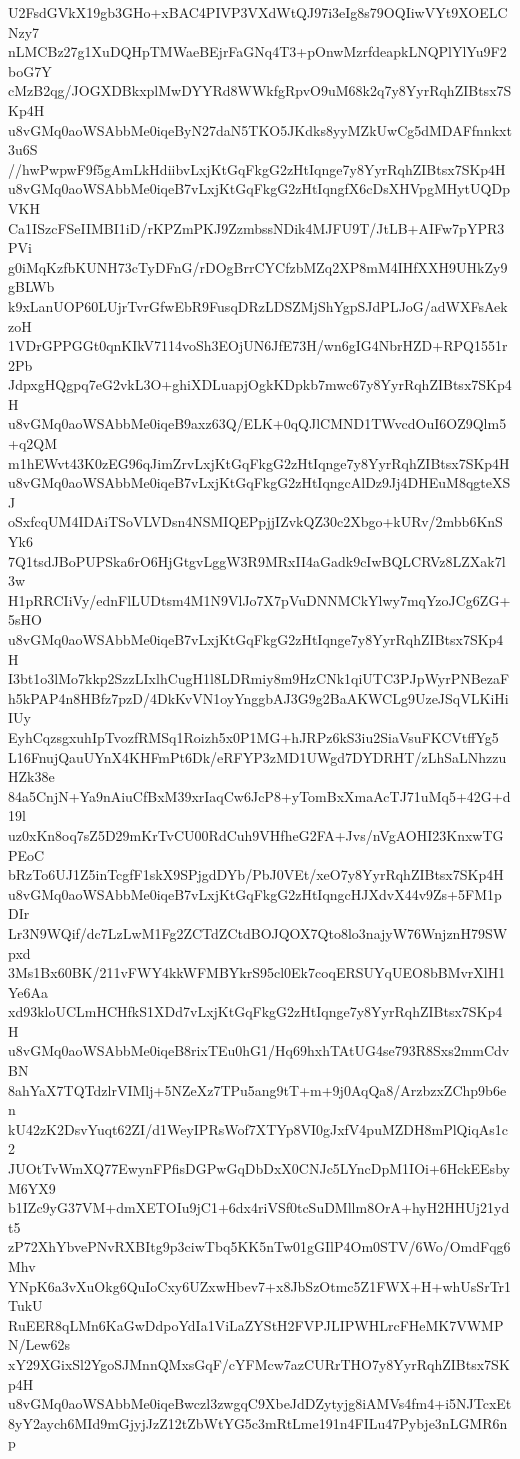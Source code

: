 U2FsdGVkX19gb3GHo+xBAC4PIVP3VXdWtQJ97i3eIg8s79OQIiwVYt9XOELCNzy7
nLMCBz27g1XuDQHpTMWaeBEjrFaGNq4T3+pOnwMzrfdeapkLNQPlYlYu9F2boG7Y
cMzB2qg/JOGXDBkxplMwDYYRd8WWkfgRpvO9uM68k2q7y8YyrRqhZIBtsx7SKp4H
u8vGMq0aoWSAbbMe0iqeByN27daN5TKO5JKdks8yyMZkUwCg5dMDAFfnnkxt3u6S
//hwPwpwF9f5gAmLkHdiibvLxjKtGqFkgG2zHtIqnge7y8YyrRqhZIBtsx7SKp4H
u8vGMq0aoWSAbbMe0iqeB7vLxjKtGqFkgG2zHtIqngfX6cDsXHVpgMHytUQDpVKH
Ca1ISzcFSeIIMBI1iD/rKPZmPKJ9ZzmbssNDik4MJFU9T/JtLB+AIFw7pYPR3PVi
g0iMqKzfbKUNH73cTyDFnG/rDOgBrrCYCfzbMZq2XP8mM4IHfXXH9UHkZy9gBLWb
k9xLanUOP60LUjrTvrGfwEbR9FusqDRzLDSZMjShYgpSJdPLJoG/adWXFsAekzoH
1VDrGPPGGt0qnKIkV7114voSh3EOjUN6JfE73H/wn6gIG4NbrHZD+RPQ1551r2Pb
JdpxgHQgpq7eG2vkL3O+ghiXDLuapjOgkKDpkb7mwc67y8YyrRqhZIBtsx7SKp4H
u8vGMq0aoWSAbbMe0iqeB9axz63Q/ELK+0qQJlCMND1TWvcdOuI6OZ9Qlm5+q2QM
m1hEWvt43K0zEG96qJimZrvLxjKtGqFkgG2zHtIqnge7y8YyrRqhZIBtsx7SKp4H
u8vGMq0aoWSAbbMe0iqeB7vLxjKtGqFkgG2zHtIqngcAlDz9Jj4DHEuM8qgteXSJ
oSxfcqUM4IDAiTSoVLVDsn4NSMIQEPpjjIZvkQZ30c2Xbgo+kURv/2mbb6KnSYk6
7Q1tsdJBoPUPSka6rO6HjGtgvLggW3R9MRxII4aGadk9cIwBQLCRVz8LZXak7l3w
H1pRRCIiVy/ednFlLUDtsm4M1N9VlJo7X7pVuDNNMCkYlwy7mqYzoJCg6ZG+5sHO
u8vGMq0aoWSAbbMe0iqeB7vLxjKtGqFkgG2zHtIqnge7y8YyrRqhZIBtsx7SKp4H
I3bt1o3lMo7kkp2SzzLIxlhCugH1l8LDRmiy8m9HzCNk1qiUTC3PJpWyrPNBezaF
h5kPAP4n8HBfz7pzD/4DkKvVN1oyYnggbAJ3G9g2BaAKWCLg9UzeJSqVLKiHiIUy
EyhCqzsgxuhIpTvozfRMSq1Roizh5x0P1MG+hJRPz6kS3iu2SiaVsuFKCVtffYg5
L16FnujQauUYnX4KHFmPt6Dk/eRFYP3zMD1UWgd7DYDRHT/zLhSaLNhzzuHZk38e
84a5CnjN+Ya9nAiuCfBxM39xrIaqCw6JcP8+yTomBxXmaAcTJ71uMq5+42G+d19l
uz0xKn8oq7sZ5D29mKrTvCU00RdCuh9VHfheG2FA+Jvs/nVgAOHI23KnxwTGPEoC
bRzTo6UJ1Z5inTcgfF1skX9SPjgdDYb/PbJ0VEt/xeO7y8YyrRqhZIBtsx7SKp4H
u8vGMq0aoWSAbbMe0iqeB7vLxjKtGqFkgG2zHtIqngcHJXdvX44v9Zs+5FM1pDIr
Lr3N9WQif/dc7LzLwM1Fg2ZCTdZCtdBOJQOX7Qto8lo3najyW76WnjznH79SWpxd
3Ms1Bx60BK/211vFWY4kkWFMBYkrS95cl0Ek7coqERSUYqUEO8bBMvrXlH1Ye6Aa
xd93kloUCLmHCHfkS1XDd7vLxjKtGqFkgG2zHtIqnge7y8YyrRqhZIBtsx7SKp4H
u8vGMq0aoWSAbbMe0iqeB8rixTEu0hG1/Hq69hxhTAtUG4se793R8Sxs2mmCdvBN
8ahYaX7TQTdzlrVIMlj+5NZeXz7TPu5ang9tT+m+9j0AqQa8/ArzbzxZChp9b6en
kU42zK2DsvYuqt62ZI/d1WeyIPRsWof7XTYp8VI0gJxfV4puMZDH8mPlQiqAs1c2
JUOtTvWmXQ77EwynFPfisDGPwGqDbDxX0CNJc5LYncDpM1IOi+6HckEEsbyM6YX9
b1IZc9yG37VM+dmXETOIu9jC1+6dx4riVSf0tcSuDMllm8OrA+hyH2HHUj21ydt5
zP72XhYbvePNvRXBItg9p3ciwTbq5KK5nTw01gGIlP4Om0STV/6Wo/OmdFqg6Mhv
YNpK6a3vXuOkg6QuIoCxy6UZxwHbev7+x8JbSzOtmc5Z1FWX+H+whUsSrTr1TukU
RuEER8qLMn6KaGwDdpoYdIa1ViLaZYStH2FVPJLIPWHLrcFHeMK7VWMPN/Lew62s
xY29XGixSl2YgoSJMnnQMxsGqF/cYFMcw7azCURrTHO7y8YyrRqhZIBtsx7SKp4H
u8vGMq0aoWSAbbMe0iqeBwczl3zwgqC9XbeJdDZytyjg8iAMVs4fm4+i5NJTcxEt
8yY2aych6MId9mGjyjJzZ12tZbWtYG5c3mRtLme191n4FILu47Pybje3nLGMR6np
